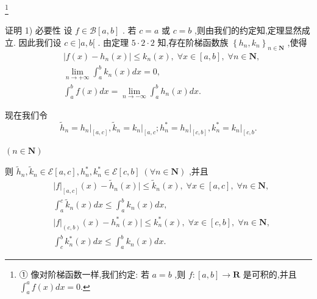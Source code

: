 \footnote{
	
	① 像对阶梯函数一样,我们约定: 若 $a = b$ ,则 $f : \left\lbrack  {a,b}\right\rbrack   \rightarrow  \mathbf{R}$ 是可积的,并且 ${\int }_{a}^{a}f\left( x\right) {dx} = 0.$
	
}

证明 1) 必要性 设 $f \in  \mathcal{B}\left\lbrack  {a,b}\right\rbrack$ . 若 $c = a$ 或 $c = b$ ,则由我们的约定知,定理显然成立. 因此我们设 $c \in  \rbrack a,b\lbrack$ . 由定理 $5 \cdot  2 \cdot  2$ 知,存在阶梯函数族 ${\left\{  {h}_{n},{k}_{n}\right\}  }_{n \in  \mathbf{N}}$ ,使得
\begin{align*}
	&\left| {f\left( x\right)  - {h}_{n}\left( x\right) }\right|  \leq  {k}_{n}\left( x\right) ,\;\forall x \in  \left\lbrack  {a,b}\right\rbrack  ,\;\forall n \in  \mathbf{N},\\
	&\mathop{\lim }\limits_{{n \rightarrow   + \infty }}{\int }_{a}^{b}{k}_{n}\left( x\right) {dx} = 0,\\
	&{\int }_{a}^{b}f\left( x\right) {dx} = \mathop{\lim }\limits_{{n \rightarrow   - \infty }}{\int }_{a}^{b}{h}_{n}\left( x\right) {dx}.
\end{align*}

现在我们令
$${\widetilde{h}}_{n} = {\left. {h}_{n}\right| }_{\left\lbrack  a,c\right\rbrack  },{\widetilde{k}}_{n} = {\left. {k}_{n}\right| }_{\left\lbrack  a,c\right. };{h}_{n}^{ * } = {\left. {h}_{n}\right| }_{\left\lbrack  c,b\right\rbrack  },{k}_{n}^{ * } = {\left. {k}_{n}\right| }_{\left\lbrack  c,b\right. }.$$

$\left( {n \in  \mathbf{N}}\right)$

则 ${\widetilde{h}}_{n},{\widetilde{k}}_{n} \in  \mathcal{E}\left\lbrack  {a,c}\right\rbrack  ,{h}_{n}^{ * },{k}_{n}^{ * } \in  \mathcal{E}\left\lbrack  {c,b}\right\rbrack  \;\left( {\forall n \in  \mathbf{N}}\right)$ ,并且
\begin{align*}
	&{\left| f\right| }_{\left\lbrack  a,c\right\rbrack  }\left( x\right)  - {\widetilde{h}}_{n}\left( x\right)  \mid   \leq  {\widetilde{k}}_{n}\left( x\right) ,\;\forall x \in  \left\lbrack  {a,c}\right\rbrack  ,\;\forall n \in  \mathbf{N},\\
	&{\int }_{a}^{c}{\widetilde{k}}_{n}\left( x\right) {dx} \leq  {\int }_{a}^{b}{k}_{n}\left( x\right) {dx},\\
	&{\left| f\right| }_{\left( c,b\right) }\left( x\right)  - {h}_{n}^{ * }\left( x\right)  \mid   \leq  {k}_{n}^{ * }\left( x\right) ,\;\forall x \in  \left\lbrack  {c,b}\right\rbrack  ,\;\forall n \in  \mathbf{N},\\
	&{\int }_{c}^{b}{k}_{n}^{ * }\left( x\right) {dx} \leq  {\int }_{a}^{b}{k}_{n}\left( x\right) {dx}.
\end{align*}

